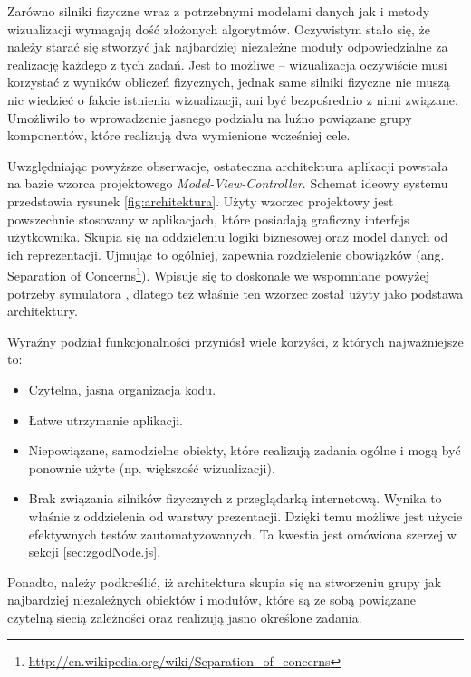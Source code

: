 Zarówno silniki fizyczne wraz z potrzebnymi modelami danych jak i metody
wizualizacji wymagają dość złożonych algorytmów. Oczywistym stało się, że
należy starać się stworzyć jak najbardziej niezależne moduły odpowiedzialne za
realizację każdego z tych zadań. Jest to możliwe -- wizualizacja oczywiście
musi korzystać z wyników obliczeń fizycznych, jednak same silniki fizyczne nie
muszą nic wiedzieć o fakcie istnienia wizualizacji, ani być bezpośrednio z
nimi związane. Umożliwiło to wprowadzenie jasnego podziału na luźno powiązane
grupy komponentów, które realizują dwa wymienione wcześniej cele.

Uwzględniając powyższe obserwacje, ostateczna architektura aplikacji powstała na
bazie wzorca projektowego \emph{Model-View-Controller}. Schemat ideowy systemu
\en przedstawia rysunek \ref{fig:architektura}. Użyty wzorzec projektowy jest
powszechnie stosowany w aplikacjach, które posiadają graficzny interfejs
użytkownika. Skupia się na oddzieleniu logiki biznesowej oraz model danych od
ich reprezentacji. Ujmując to ogólniej, zapewnia rozdzielenie obowiązków (ang.
Separation of
Concerns\footnote{\url{http://en.wikipedia.org/wiki/Separation_of_concerns}}).
Wpisuje się to doskonale we wspomniane powyżej potrzeby symulatora \en, dlatego
też właśnie ten wzorzec został użyty jako podstawa architektury.

Wyraźny podział funkcjonalności przyniósł wiele korzyści, z których
najważniejsze to:

\begin{itemize}
\item Czytelna, jasna organizacja kodu.

\item Łatwe utrzymanie aplikacji.

\item Niepowiązane, samodzielne obiekty, które realizują zadania ogólne i mogą
być ponownie użyte (np. większość wizualizacji).

\item Brak związania silników fizycznych z przeglądarką internetową. Wynika to
właśnie z oddzielenia od warstwy prezentacji. Dzięki temu możliwe jest użycie
efektywnych testów zautomatyzowanych. Ta kwestia jest omówiona szerzej w sekcji
\ref{sec:zgodNode.js}.

\end{itemize}

Ponadto, należy podkreślić, iż architektura \en skupia się na stworzeniu grupy
jak najbardziej niezależnych obiektów i modułów, które są ze sobą powiązane
czytelną siecią zależności oraz realizują jasno określone zadania.

